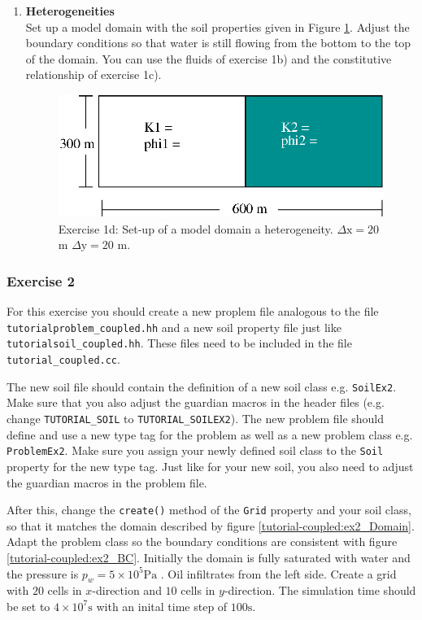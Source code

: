 \begin{enumerate}
\item \textbf{Heterogeneities}  \\
  Set up a model domain with the soil properties given in Figure
  \ref{tutorial-coupled:exercise1_d}. Adjust the boundary conditions
  so that water is still flowing from the bottom to the top of the
  domain. You can use the fluids of exercise 1b) and the constitutive
  relationship of exercise 1c).

\begin{figure}[h]
\centering
\includegraphics[width=0.5\linewidth,keepaspectratio]{EPS/exercise1_c.eps}
\caption{Exercise 1d: Set-up of a model domain a heterogeneity. $\Delta \text{x} = 20$ m $\Delta \text{y} = 20$ m.}\label{tutorial-coupled:exercise1_d}
\end{figure}

\end{enumerate}

\subsubsection{Exercise 2}
For this exercise you should create a new proplem file analogous to
the file \texttt{tutorialproblem\_coupled.hh} and a new soil property
file just like \texttt{tutorialsoil\_coupled.hh}. These files need to
be included in the file \texttt{tutorial\_coupled.cc}. 

The new soil file should contain the definition of a new soil class
e.g. \texttt{SoilEx2}. Make sure that you also adjust the guardian
macros in the header files (e.g. change \texttt{TUTORIAL\_SOIL} to
\texttt{TUTORIAL\_SOILEX2}).  The new problem file should define and
use a new type tag for the problem as well as a new problem class
e.g. \texttt{ProblemEx2}. Make sure you assign your newly defined soil
class to the \texttt{Soil} property for the new type tag. Just like
for your new soil, you also need to adjust the guardian macros in the
problem file.

After this, change the \texttt{create()} method of the \texttt{Grid}
property and your soil class, so that it matches the domain described
by figure \ref{tutorial-coupled:ex2_Domain}. Adapt the problem class
so the boundary conditions are consistent with figure
\ref{tutorial-coupled:ex2_BC}. Initially the domain is fully saturated
with water and the pressure is $p_w = 5 \times 10^5 \text{Pa}$ . Oil
infiltrates from the left side. Create a grid with $20$ cells in
$x$-direction and $10$ cells in $y$-direction. The simulation time
should be set to $4\times 10^7 \text{s}$ with an inital time step of
$100 \text{s}$.

